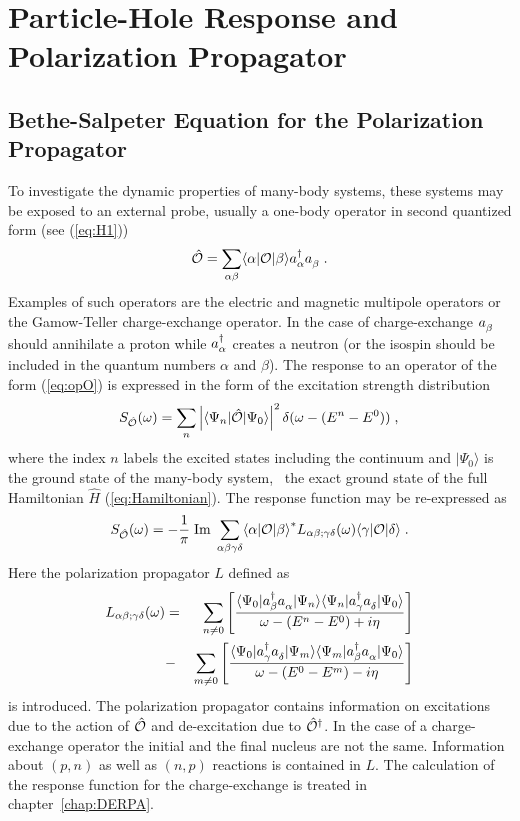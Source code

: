 \section{Particle-Hole Response and Polarization Propagator}
\subsection{Bethe-Salpeter Equation for the Polarization Propagator}
%
To investigate the dynamic properties of many-body systems, these systems
may be exposed to an external probe,
usually a one-body operator in second quantized form (see (\ref{eq:H1}))
%
	\begin{equation}
		\opO
	=
		\sum_{\alpha\beta}
		\ME<\alpha|\opOhatless|\beta> \Oc{\alpha} \Oa{\beta}
	\;.
	\label{eq:opO}
	\end{equation}
%
Examples of such operators are the electric and magnetic multipole operators
or the Gamow-Teller charge-exchange operator.
In the case of charge-exchange $\Oa{\beta}$ should annihilate a proton while
$\Oc{\alpha}$ creates a neutron (or the isospin should be included in the 
quantum numbers $\alpha$ and $\beta$).
The response to an operator of the form (\ref{eq:opO}) is expressed in the 
form of the excitation strength distribution
%
	\begin{equation}
		S_\opO(\omega)
	=
		\sum_n
		\left|
			\ME<\Psi_n|\opO|\Psi_0>
		\right|^2
		\delta(\omega-(E^n-E^0)) 
	\label{eq:SopO}
	\;,
	\nonumber \\
	\end{equation}
%
where the index $n$ labels the excited states including the continuum and 
$|\Psi_0\rangle$ is the ground state of the many-body system, \ie\ the exact
ground state of the full Hamiltonian $\hat{H}$ (\ref{eq:Hamiltonian}). 
The response function may be re-expressed as
%
\begin{equation}
		S_\opO(\omega)
	=
		-\frac{1}{\pi}
		\;
		{\rm Im}
		\;
		\sum_{\alpha\beta\gamma\delta}
		\ME<\alpha|\opOhatless|\beta>^*
		L_{\alpha\beta;\gamma\delta}(\omega)
		\ME<\gamma|\opOhatless|\delta>
	\;.
	\label{eq:defS}
	\end{equation}
%
Here the polarization propagator $L$ defined as
%
	\begin{eqnarray}
		L_{\alpha\beta;\gamma\delta}(\omega)
	&=&
		\sum_{n\not=0}
		\left[
			\frac{\ME<\Psi_0|\Oc{\beta}  \Oa{\alpha}|\Psi_n>
			      \ME<\Psi_n|\Oc{\gamma} \Oa{\delta}|\Psi_0>
			}
			{\omega-(E^n-E^0)+i\eta}
		\right] 
	\nonumber \\
	&-&
		\sum_{m\not=0}
		\left[
			\frac{\ME<\Psi_0|\Oc{\gamma} \Oa{\delta}|\Psi_m>
			      \ME<\Psi_m|\Oc{\beta}  \Oa{\alpha}|\Psi_0>
			}
			{\omega-(E^0-E^m)-i\eta}
		\right]
	\label{eq:DefLLeh}
	\end{eqnarray}
%
is introduced. The polarization propagator contains information on
excitations due to the action of $\opO$ and de-excitation due to 
$\opO^\dagger$. In the case of a charge-exchange operator 
the  initial and the final nucleus are not the same.
Information
about $(p,n)$ as well as $(n,p)$ reactions is contained in $L$.
The calculation of the response function for the charge-exchange 
is treated in chapter~\ref{chap:DERPA}. 


